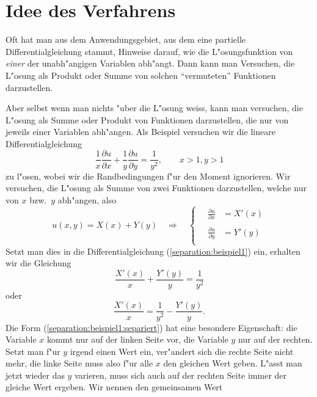 \section{Idee des Verfahrens}
Oft hat man aus dem Anwendungsgebiet, aus dem eine partielle
Differentialgleichung stammt, Hinweise darauf, wie die L"osungsfunktion
von {\em einer} der unabh"angigen Variablen abh"angt.
Dann kann man Versuchen, die L"osung als Produkt oder Summe von
solchen ``vermuteten'' Funktionen darzustellen.

Aber selbst wenn man nichts "uber die L"osung weiss, kann man 
versuchen, die L"osung als Summe oder Produkt von Funktionen darzustellen,
die nur von jeweils einer Variablen abh"angen. Als Beispiel versuchen
wir die lineare Differentialgleichung 
\begin{equation}
\frac1x
\frac{\partial u}{\partial x}
+
\frac1y
\frac{\partial u}{\partial y}
=\frac1{y^2}
,
\qquad x>1, y>1
\label{separation:beispiel1}
\end{equation}
zu l"osen, wobei wir die Randbedingungen f"ur den Moment ignorieren.
Wir versuchen, die L"osung als Summe von zwei Funktionen darzustellen,
welche nur von $x$ bzw.~$y$ abh"angen, also
\begin{equation}
u(x,y)=X(x)+Y(y)
\quad\Rightarrow\quad
\begin{cases}
\quad{\displaystyle \frac{\partial u}{\partial x}}&=X'(x)\\
\\
\quad{\displaystyle \frac{\partial u}{\partial y}}&=Y'(y)\\
\end{cases}
\label{separation:beispiel1:ansatz}
\end{equation}
Setzt man dies in die Differentialgleichung (\ref{separation:beispiel1})
ein, erhalten wir die Gleichung
\[
\frac{X'(x)}{x}+\frac{Y'(y)}{y}=\frac1{y^2}
\]
oder
\begin{equation}
\frac{X'(x)}{x}
=\frac1{y^2}
-\frac{Y'(y)}{y}.
\label{separation:beispiel1:separiert}
\end{equation}
Die Form (\ref{separation:beispiel1:separiert}) hat eine besondere
Eigenschaft: die Variable $x$ kommt nur auf der linken Seite vor,
die Variable $y$ nur auf der rechten. Setzt man f"ur $y$ irgend
einen Wert ein, ver"andert sich die rechte Seite nicht mehr,
die linke Seite muss also f"ur alle $x$ den gleichen Wert geben.
L"asst man jetzt wieder das $y$ varieren, muss sich auch auf der rechten
Seite immer der gleiche Wert ergeben. Wir nennen den gemeinsamen Wert
